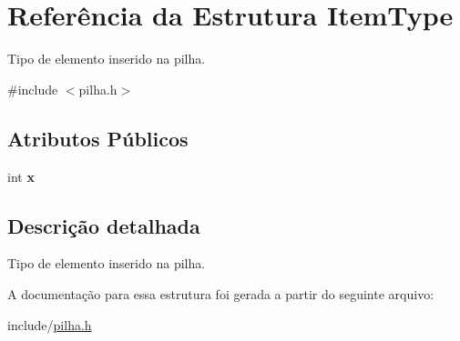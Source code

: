 \hypertarget{struct_item_type}{}\section{Referência da Estrutura Item\+Type}
\label{struct_item_type}


Tipo de elemento inserido na pilha.  




{\ttfamily \#include $<$pilha.\+h$>$}

\subsection*{Atributos Públicos}
\begin{DoxyCompactItemize}
\item 
\mbox{\label{struct_item_type_ac607cb8d69e5763265e33fda4c1867a7}} 
int {\bfseries x}
\end{DoxyCompactItemize}


\subsection{Descrição detalhada}
Tipo de elemento inserido na pilha. 

A documentação para essa estrutura foi gerada a partir do seguinte arquivo\+:\begin{DoxyCompactItemize}
\item 
include/\mbox{\hyperlink{pilha_8h}{pilha.\+h}}\end{DoxyCompactItemize}
